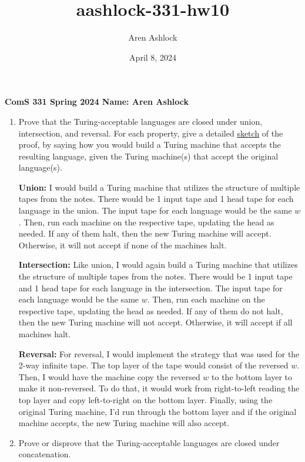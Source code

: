 \documentclass[12pt]{article}
\title{aashlock-331-hw10}
\author{Aren Ashlock}
\date{April 8, 2024}
\begin{document}
\noindent\textbf{ComS 331 \quad Spring 2024 \quad Name: Aren Ashlock}

\begin{enumerate}


\item Prove that the Turing-acceptable languages are closed under union, intersection, and reversal. For each property, give a detailed \underline{sketch} of the proof, by saying how you would build a Turing machine that accepts the resulting language, given the Turing machine(s) that accept the original language(s). 

\color{blue}
    \textbf{Union:} I would build a Turing machine that utilizes the structure of multiple tapes from the notes. There would be 1 input tape and 1 head tape for each language in the union. The input tape for each language would be the same $w$. Then, run each machine on the respective tape, updating the head as needed. If any of them halt, then the new Turing machine will accept. Otherwise, it will not accept if none of the machines halt.
    
    \textbf{Intersection:} Like union, I would again build a Turing machine that utilizes the structure of multiple tapes from the notes. There would be 1 input tape and 1 head tape for each language in the intersection. The input tape for each language would be the same $w$. Then, run each machine on the respective tape, updating the head as needed. If any of them do not halt, then the new Turing machine will not accept. Otherwise, it will accept if all machines halt.
    
    \textbf{Reversal:} For reversal, I would implement the strategy that was used for the 2-way infinite tape. The top layer of the tape would consist of the reversed $w$. Then, I would have the machine copy the reversed $w$ to the bottom layer to make it non-reversed. To do that, it would work from right-to-left reading the top layer and copy left-to-right on the bottom layer. Finally, using the original Turing machine, I'd run through the bottom layer and if the original machine accepts, the new Turing machine will also accept.
\color{black}



\item Prove or disprove that the Turing-acceptable languages are closed under concatenation.


\end{enumerate}
\end{document}
